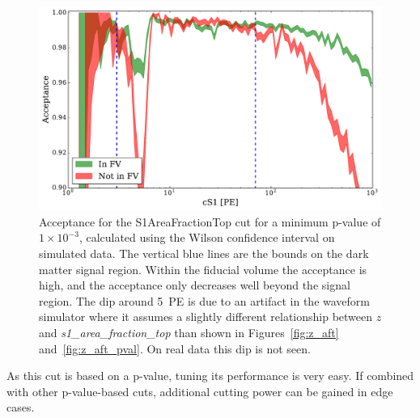 \begin{figure}[htb]
\centering
    \includegraphics[width=\textwidth]{figures/s1aft/s1aftacceptance}
    \caption{Acceptance for the S1AreaFractionTop cut for a minimum p-value of $1\times10^{-3}$, calculated using the Wilson confidence interval on simulated data. The vertical blue lines are the bounds on the dark matter signal region. Within the fiducial volume the acceptance is high, and the acceptance only decreases well beyond the signal region. The dip around 5~PE is due to an artifact in the waveform simulator where it assumes a slightly different relationship between $z$ and \textit{s1\_area\_fraction\_top} than shown in Figures~\ref{fig:z_aft} and~\ref{fig:z_aft_pval}. On real data this dip is not seen.}\label{fig:accept}
\end{figure}

As this cut is based on a p-value, tuning its performance is very easy. If combined with other p-value-based cuts, additional cutting power can be gained in edge cases.
